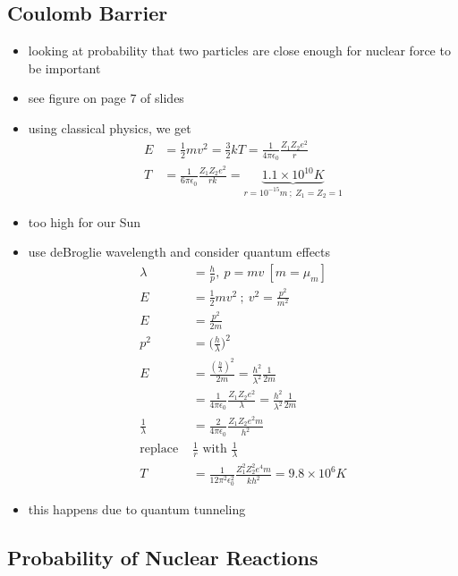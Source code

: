 \documentclass[a4paper,11pt,normalem]{article}
\begin{document}
\subsection{Coulomb Barrier}
\begin{itemize}
    \item looking at probability that two particles are close enough for nuclear force to be important
    \item see figure on page 7 of slides
    \item using classical physics, we get
        \begin{align*}
            E &= \frac{1}{2}mv^2 = \frac{3}{2}kT = \frac{1}{4\pi\epsilon_0}\frac{Z_1Z_2e^2}{r} \\
            T &= \frac{1}{6\pi\epsilon_0}\frac{Z_1Z_2e^2}{rk} = \underbrace{1.1\times10^{10}K}_{r = 10^{-15}m ~;~ Z_1 = Z_2 = 1}
        \end{align*}
    \item too high for our Sun
    \item use deBroglie wavelength and consider quantum effects
        \begin{align*}
            \lambda &= \frac{h}{p},~ p = mv ~[m = \mu_m] \\
            E &= \frac{1}{2}mv^2 ~;~ v^2 = \frac{p^2}{m^2} \\
            E &= \frac{p^2}{2m} \\
            p^2 &= \Big(\frac{h}{\lambda}\Big)^2 \\
            E &= \frac{(\frac{h}{\lambda})^2}{2m} = \frac{h^2}{\lambda^2}\frac{1}{2m} \\
            &= \frac{1}{4\pi \epsilon_0}\frac{Z_1Z_2e^2}{\lambda} = \frac{h^2}{\lambda^2}\frac{1}{2m} \\
            \frac{1}{\lambda} &= \frac{2}{4\pi\epsilon_0}\frac{Z_1Z_2e^2 m}{h^2} \\
            \text{replace }&\frac{1}{r} \text{ with }\frac{1}{\lambda} \\
            T &= \frac{1}{12\pi^2 \epsilon_{0}^2} \frac{Z_1^2Z_2^2e^4 m}{kh^2} = 9.8\times10^6 K
        \end{align*}
    \item this happens due to quantum tunneling
\end{itemize}

\subsection{Probability of Nuclear Reactions}
\end{document}
